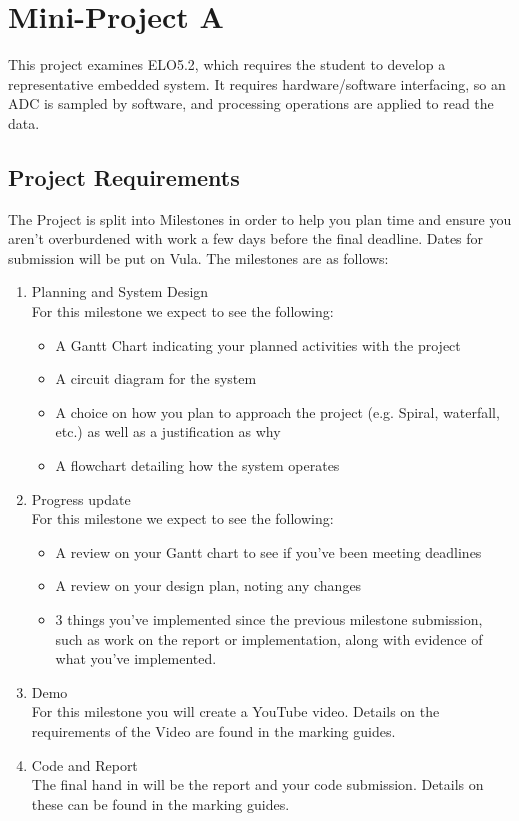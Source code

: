 \chapter{Mini-Project A}
\label{sec:ProjA}
This project examines ELO5.2, which requires the student to develop a representative embedded system. It requires hardware/software interfacing, so an ADC is sampled by software, and processing operations are applied to read the data. 

\section{Project Requirements}
The Project is split into Milestones in order to help you plan time and ensure you aren't overburdened with work a few days before the final deadline. Dates for submission will be put on Vula. The milestones are as follows:
\begin{enumerate}
    \renewcommand{\theenumi}{\Alph{enumi}}
    \item Planning and System Design\\
    For this milestone we expect to see the following:
    \begin{itemize}
        \item A Gantt Chart indicating your planned activities with the project
        \item A circuit diagram for the system
        \item A choice on how you plan to approach the project (e.g. Spiral, waterfall, etc.) as well as a justification as why
        \item A flowchart detailing how the system operates
    \end{itemize}
    \item Progress update\\
    For this milestone we expect to see the following:
    \begin{itemize}
        \item A review on your Gantt chart to see if you've been meeting deadlines
        \item A review on your design plan, noting any changes
        \item 3 things you've implemented since the previous milestone submission, such as work on the report or implementation, along with evidence of what you've implemented.
    \end{itemize}
    \item Demo\\
    For this milestone you will create a YouTube video. Details on the requirements of the Video are found in the marking guides. 
    \item Code and Report\\
    The final hand in will be the report and your code submission. Details on these can be found in the marking guides.
\end{enumerate}

